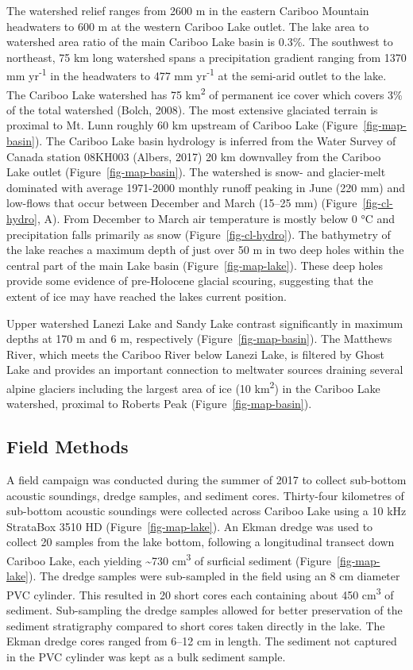 \documentclass[
  letterpaper,
  DIV=11,
  numbers=noendperiod]{scrartcl}
\begin{document}
The watershed relief ranges from 2600 m in the eastern Cariboo Mountain
headwaters to 600 m at the western Cariboo Lake outlet. The lake area to
watershed area ratio of the main Cariboo Lake basin is 0.3\%. The
southwest to northeast, 75 km long watershed spans a precipitation
gradient ranging from 1370 mm yr\textsuperscript{-1} in the headwaters
to 477 mm yr\textsuperscript{-1} at the semi-arid outlet to the lake.
The Cariboo Lake watershed has 75 km\textsuperscript{2} of permanent ice
cover which covers 3\% of the total watershed (Bolch, 2008). The most
extensive glaciated terrain is proximal to Mt. Lunn roughly 60 km
upstream of Cariboo Lake (Figure~\ref{fig-map-basin}). The Cariboo Lake
basin hydrology is inferred from the Water Survey of Canada station
08KH003 (Albers, 2017) 20 km downvalley from the Cariboo Lake outlet
(Figure~\ref{fig-map-basin}). The watershed is snow- and glacier-melt
dominated with average 1971-2000 monthly runoff peaking in June (220 mm)
and low-flows that occur between December and March (15--25 mm)
(Figure~\ref{fig-cl-hydro}, A). From December to March air temperature
is mostly below 0 °C and precipitation falls primarily as snow
(Figure~\ref{fig-cl-hydro}). The bathymetry of the lake reaches a
maximum depth of just over 50 m in two deep holes within the central
part of the main Lake basin (Figure~\ref{fig-map-lake}). These deep
holes provide some evidence of pre-Holocene glacial scouring, suggesting
that the extent of ice may have reached the lakes current position.

Upper watershed Lanezi Lake and Sandy Lake contrast significantly in
maximum depths at 170 m and 6 m, respectively
(Figure~\ref{fig-map-basin}). The Matthews River, which meets the
Cariboo River below Lanezi Lake, is filtered by Ghost Lake and provides
an important connection to meltwater sources draining several alpine
glaciers including the largest area of ice (10 km\textsuperscript{2}) in
the Cariboo Lake watershed, proximal to Roberts Peak
(Figure~\ref{fig-map-basin}).

\hypertarget{field-methods}{%
\subsection{Field Methods}\label{field-methods}}

A field campaign was conducted during the summer of 2017 to collect
sub-bottom acoustic soundings, dredge samples, and sediment cores.
Thirty-four kilometres of sub-bottom acoustic soundings were collected
across Cariboo Lake using a 10 kHz StrataBox 3510 HD
(Figure~\ref{fig-map-lake}). An Ekman dredge was used to collect 20
samples from the lake bottom, following a longitudinal transect down
Cariboo Lake, each yielding \textasciitilde730 cm\textsuperscript{3} of
surficial sediment (Figure~\ref{fig-map-lake}). The dredge samples were
sub-sampled in the field using an 8 cm diameter PVC cylinder. This
resulted in 20 short cores each containing about 450
cm\textsuperscript{3} of sediment. Sub-sampling the dredge samples
allowed for better preservation of the sediment stratigraphy compared to
short cores taken directly in the lake. The Ekman dredge cores ranged
from 6--12 cm in length. The sediment not captured in the PVC cylinder
was kept as a bulk sediment sample.
\end{document}
